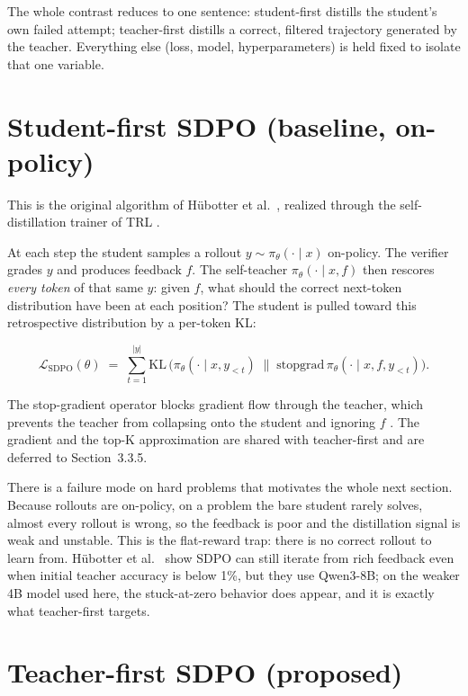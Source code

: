 \documentclass[12pt,a4paper]{report}
\begin{document}
The whole contrast reduces to one sentence: student-first distills the student's own failed attempt; teacher-first distills a correct, filtered trajectory generated by the teacher. Everything else (loss, model, hyperparameters) is held fixed to isolate that one variable.

\section{Student-first SDPO (baseline, on-policy)}\label{student-first-sdpo-baseline-on-policy}

This is the original algorithm of Hübotter et al.~\cite{r1}, realized through the self-distillation trainer of TRL \cite{r5}.

At each step the student samples a rollout \(y \sim \pi_\theta(\cdot \mid x)\) on-policy. The verifier grades \(y\) and produces feedback \(f\). The self-teacher \(\pi_\theta(\cdot \mid x, f)\) then rescores \emph{every token} of that same \(y\): given \(f\), what should the correct next-token distribution have been at each position? The student is pulled toward this retrospective distribution by a per-token KL:

\[
\mathcal{L}_{\text{SDPO}}(\theta) \;=\; \sum_{t=1}^{|y|} \mathrm{KL}\,\Big(\pi_\theta(\cdot \mid x, y_{<t}) \;\big\|\; \mathrm{stopgrad}\,\pi_\theta(\cdot \mid x, f, y_{<t})\Big).
\]

The stop-gradient operator blocks gradient flow through the teacher, which prevents the teacher from collapsing onto the student and ignoring \(f\) \cite{r1}. The gradient and the top-K approximation are shared with teacher-first and are deferred to Section~3.3.5.

There is a failure mode on hard problems that motivates the whole next section. Because rollouts are on-policy, on a problem the bare student rarely solves, almost every rollout is wrong, so the feedback is poor and the distillation signal is weak and unstable. This is the flat-reward trap: there is no correct rollout to learn from. Hübotter et al.~\cite{r1} show SDPO can still iterate from rich feedback even when initial teacher accuracy is below 1\%, but they use Qwen3-8B; on the weaker 4B model used here, the stuck-at-zero behavior does appear, and it is exactly what teacher-first targets.

\section{Teacher-first SDPO (proposed)}\label{teacher-first-sdpo-proposed}
\end{document}
